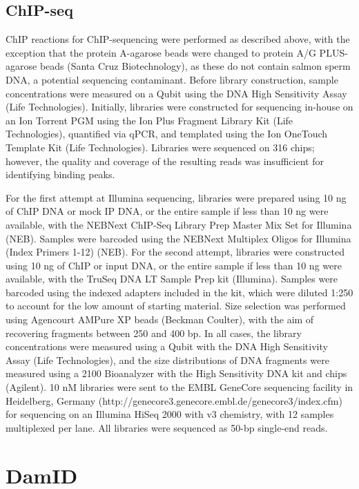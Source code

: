 \subsection{ChIP-seq}
ChIP reactions for ChIP-sequencing were performed as described above, with the exception that the protein A-agarose beads were changed to protein A/G PLUS-agarose beads (Santa Cruz Biotechnology), as these do not contain salmon sperm DNA, a potential sequencing contaminant. Before library construction, sample concentrations were measured on a Qubit using the DNA High Sensitivity Assay (Life Technologies). Initially, libraries were constructed for sequencing in-house on an Ion Torrent PGM using the Ion Plus Fragment Library Kit (Life Technologies), quantified via qPCR, and templated using the Ion OneTouch Template Kit (Life Technologies). Libraries were sequenced on 316 chips; however, the quality and coverage of the resulting reads was insufficient for identifying binding peaks.

For the first attempt at Illumina sequencing, libraries were prepared using 10 ng of ChIP DNA or mock IP DNA, or the entire sample if less than 10 ng were available, with the NEBNext ChIP-Seq Library Prep Master Mix Set for Illumina (NEB). Samples were barcoded using the NEBNext Multiplex Oligos for Illumina (Index Primers 1-12) (NEB). For the second attempt, libraries were constructed using 10 ng of ChIP or input DNA, or the entire sample if less than 10 ng were available, with the TruSeq DNA LT Sample Prep kit (Illumina). Samples were barcoded using the indexed adapters included in the kit, which were diluted 1:250 to account for the low amount of starting material. Size selection was performed using Agencourt AMPure XP beads (Beckman Coulter), with the aim of recovering fragments between 250 and 400 bp. In all cases, the library concentrations were measured using a Qubit with the DNA High Sensitivity Assay (Life Technologies), and the size distributions of DNA fragments were measured using a 2100 Bioanalyzer with the High Sensitivity DNA kit and chips (Agilent). 10 nM libraries were sent to the EMBL GeneCore sequencing facility in Heidelberg, Germany (http://genecore3.genecore.embl.de/genecore3/index.cfm) for sequencing on an Illumina HiSeq 2000 with v3 chemistry, with 12 samples multiplexed per lane. All libraries were sequenced as 50-bp single-end reads.

\section{DamID}
